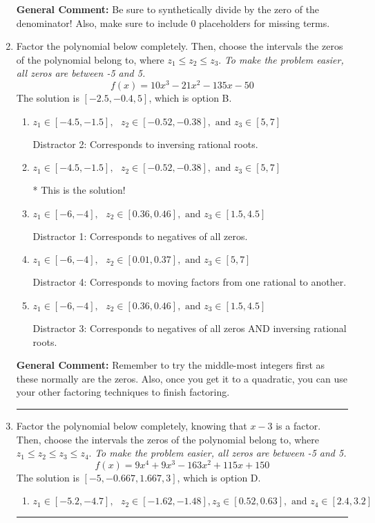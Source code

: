 \documentclass{extbook}[14pt]
\newcommand{\litem}[1]{\item #1

\rule{\textwidth}{0.4pt}}
\begin{document}
\begin{enumerate}
{\textbf{General Comment:} Be sure to synthetically divide by the zero of the denominator! Also, make sure to include 0 placeholders for missing terms.
}
\litem{
Factor the polynomial below completely. Then, choose the intervals the zeros of the polynomial belong to, where $z_1 \leq z_2 \leq z_3$. \textit{To make the problem easier, all zeros are between -5 and 5.}
\[ f(x) = 10x^{3} -21 x^{2} -135 x -50 \]The solution is \( [-2.5, -0.4, 5] \), which is option B.\begin{enumerate}[label=\Alph*.]
\item \( z_1 \in [-4.5, -1.5], \text{   }  z_2 \in [-0.52, -0.38], \text{   and   } z_3 \in [5, 7] \)

 Distractor 2: Corresponds to inversing rational roots.
\item \( z_1 \in [-4.5, -1.5], \text{   }  z_2 \in [-0.52, -0.38], \text{   and   } z_3 \in [5, 7] \)

* This is the solution!
\item \( z_1 \in [-6, -4], \text{   }  z_2 \in [0.36, 0.46], \text{   and   } z_3 \in [1.5, 4.5] \)

 Distractor 1: Corresponds to negatives of all zeros.
\item \( z_1 \in [-6, -4], \text{   }  z_2 \in [0.01, 0.37], \text{   and   } z_3 \in [5, 7] \)

 Distractor 4: Corresponds to moving factors from one rational to another.
\item \( z_1 \in [-6, -4], \text{   }  z_2 \in [0.36, 0.46], \text{   and   } z_3 \in [1.5, 4.5] \)

 Distractor 3: Corresponds to negatives of all zeros AND inversing rational roots.
\end{enumerate}

\textbf{General Comment:} Remember to try the middle-most integers first as these normally are the zeros. Also, once you get it to a quadratic, you can use your other factoring techniques to finish factoring.
}
\litem{
Factor the polynomial below completely, knowing that $x -3$ is a factor. Then, choose the intervals the zeros of the polynomial belong to, where $z_1 \leq z_2 \leq z_3 \leq z_4$. \textit{To make the problem easier, all zeros are between -5 and 5.}
\[ f(x) = 9x^{4} +9 x^{3} -163 x^{2} +115 x + 150 \]The solution is \( [-5, -0.667, 1.667, 3] \), which is option D.\begin{enumerate}[label=\Alph*.]
\item \( z_1 \in [-5.2, -4.7], \text{   }  z_2 \in [-1.62, -1.48], z_3 \in [0.52, 0.63], \text{   and   } z_4 \in [2.4, 3.2] \)


\end{enumerate}}
\end{enumerate}
\end{document}
